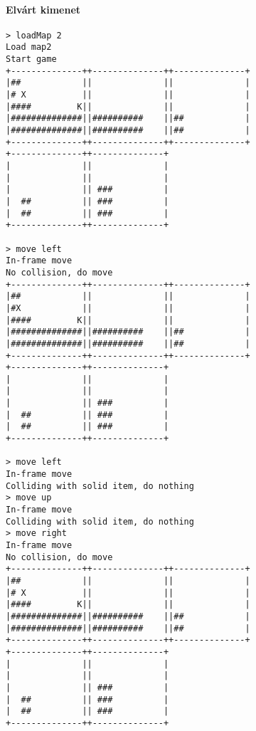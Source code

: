 		        \paragraph*{Elvárt kimenet}
\begin{verbatim}
> loadMap 2
Load map2
Start game
+--------------++--------------++--------------+
|##            ||              ||              |
|# X           ||              ||              |
|####         K||              ||              |
|##############||##########    ||##            |
|##############||##########    ||##            |
+--------------++--------------++--------------+
+--------------++--------------+                
|              ||              |                
|              ||              |                
|              || ###          |                
|  ##          || ###          |                
|  ##          || ###          |                
+--------------++--------------+                

> move left
In-frame move
No collision, do move
+--------------++--------------++--------------+
|##            ||              ||              |
|#X            ||              ||              |
|####         K||              ||              |
|##############||##########    ||##            |
|##############||##########    ||##            |
+--------------++--------------++--------------+
+--------------++--------------+                
|              ||              |                
|              ||              |                
|              || ###          |                
|  ##          || ###          |                
|  ##          || ###          |                
+--------------++--------------+                

> move left
In-frame move
Colliding with solid item, do nothing
> move up
In-frame move
Colliding with solid item, do nothing
> move right
In-frame move
No collision, do move
+--------------++--------------++--------------+
|##            ||              ||              |
|# X           ||              ||              |
|####         K||              ||              |
|##############||##########    ||##            |
|##############||##########    ||##            |
+--------------++--------------++--------------+
+--------------++--------------+                
|              ||              |                
|              ||              |                
|              || ###          |                
|  ##          || ###          |                
|  ##          || ###          |                
+--------------++--------------+                


\end{verbatim}
